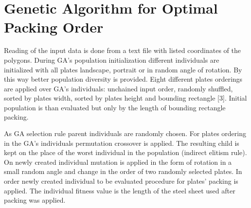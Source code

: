 \documentclass{llncs}
\begin{document}
\section{Genetic Algorithm for Optimal Packing Order}
%
Reading of the input data is done from a text file with listed coordinates of the polygons. During GA's population initialization different individuals are initialized with all plates landscape, portrait or in random angle of rotation. By this way better population diversity is provided. Eight different plates orderings are applied over GA's individuals: unchained input order, randomly shuffled, sorted by plates width, sorted by plates height and bounding rectangle [3]. Initial population is than evaluated but only by the length of bounding rectangle packing. 

As GA selection rule parent individuals are randomly chosen. For plates ordering in the GA's individuals permutation crossover is applied. The resulting child is kept on the place of the worst individual in the population (indirect elitism rule). On newly created individual mutation is applied in the form of rotation in a small random angle and change in the order of two randomly selected plates. In order newly created individual to be evaluated procedure for plates' packing is applied. The individual fitness value is the length of the steel sheet used after packing was applied. 
%
\end{document}
